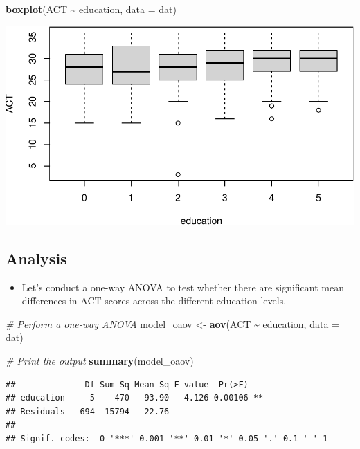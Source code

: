 \documentclass[
]{book}
\newenvironment{Shaded}{\begin{snugshade}}{\end{snugshade}}
\newcommand{\AttributeTok}[1]{\textcolor[rgb]{0.13,0.29,0.53}{#1}}
\newcommand{\CommentTok}[1]{\textcolor[rgb]{0.56,0.35,0.01}{\textit{#1}}}
\newcommand{\FunctionTok}[1]{\textcolor[rgb]{0.13,0.29,0.53}{\textbf{#1}}}
\newcommand{\NormalTok}[1]{#1}
\newcommand{\OtherTok}[1]{\textcolor[rgb]{0.56,0.35,0.01}{#1}}
\newcommand{\SpecialCharTok}[1]{\textcolor[rgb]{0.81,0.36,0.00}{\textbf{#1}}}
\providecommand{\tightlist}{%
  \setlength{\itemsep}{0pt}\setlength{\parskip}{0pt}}
\begin{document}
\begin{Shaded}
\begin{Highlighting}[]
\FunctionTok{boxplot}\NormalTok{(ACT }\SpecialCharTok{\textasciitilde{}}\NormalTok{ education, }\AttributeTok{data =}\NormalTok{ dat)}
\end{Highlighting}
\end{Shaded}

\includegraphics{PSY202A-Modeling-I.Heo_files/figure-latex/unnamed-chunk-94-2.pdf}

\subsection{Analysis}\label{analysis}

\begin{itemize}
\tightlist
\item
  Let's conduct a one-way ANOVA to test whether there are significant mean differences in ACT scores across the different education levels.
\end{itemize}

\begin{Shaded}
\begin{Highlighting}[]
\CommentTok{\# Perform a one{-}way ANOVA}
\NormalTok{model\_oaov }\OtherTok{\textless{}{-}} \FunctionTok{aov}\NormalTok{(ACT }\SpecialCharTok{\textasciitilde{}}\NormalTok{ education, }\AttributeTok{data =}\NormalTok{ dat)}

\CommentTok{\# Print the output}
\FunctionTok{summary}\NormalTok{(model\_oaov)}
\end{Highlighting}
\end{Shaded}

\begin{verbatim}
##              Df Sum Sq Mean Sq F value  Pr(>F)   
## education     5    470   93.90   4.126 0.00106 **
## Residuals   694  15794   22.76                   
## ---
## Signif. codes:  0 '***' 0.001 '**' 0.01 '*' 0.05 '.' 0.1 ' ' 1
\end{verbatim}
\end{document}
